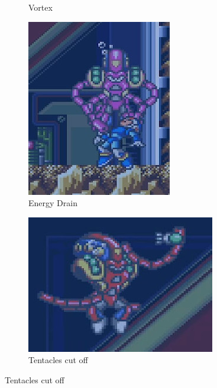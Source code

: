 \begin{figure}[htp]
\begin{subfigure}{0.2\textwidth}
		\caption{Vortex}
	\end{subfigure}
	\begin{subfigure}{0.37\textwidth}
			\centering
			\includegraphics[width=\linewidth]{figures/X1/Launch_octopus/Octopus_drain.jpg}
			\caption{Energy Drain}
	\end{subfigure}
	\begin{subfigure}{0.39\textwidth}
		\centering
		\includegraphics[width=\linewidth]{figures/X1/Launch_octopus/Octopus_cut.jpg}
		\caption{Tentacles cut off}
	\end{subfigure}
	

\end{figure}
